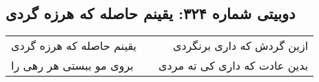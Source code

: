 \begin{center}
\section*{دوبیتی شماره ۳۲۴: یقینم حاصله که هرزه گردی}
\label{sec:324}
\begin{longtable}{l p{0.5cm} r}
یقینم حاصله که هرزه گردی
&&
ازین گردش که داری برنگردی
\\
بروی مو ببستی هر رهی را
&&
بدین عادت که داری کی ته مردی
\\
\end{longtable}
\end{center}
